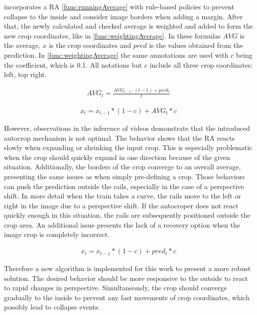 \cite{tepNet2024} incorporates a \ac{RA} \autoref{func:runningAverage} with rule-based policies to prevent collapse to the inside and consider image borders when adding a margin. After that, the newly calculated and checked average is weighted and added to form the new crop coordinates, like in \autoref{func:weightingAverage}. In these formulas $AVG$ is the average, $x$ is the crop coordinates and $pred$ is the values obtained from the prediction. In \autoref{func:weightingAverage} the same annotations are used with $c$ being the coefficient, which is 0.1. All notations but $c$ include all three crop coordinates: left, top right.

\begin{align}
    AVG_t = \frac{AVG_{t-1} \cdot (t-1) + pred_t}{t}
    \label{func:runningAverage}
\end{align}

\begin{align}
    x_{t} = x_{t-1} * (1 - c) + AVG_{t} * c
    \label{func:weightingAverage}
\end{align}

However, observations in the inference of videos demonstrate that the introduced autocrop mechanism is not optimal. The behavior shows that the \ac{RA} reacts slowly when expanding or shrinking the input crop. This is especially problematic when the crop should quickly expand in one direction because of the given situation. Additionally, the borders of the crop converge to an overall average, presenting the same issues as when simply pre-defining a crop. Those behaviors can push the prediction outside the rails, especially in the case of a perspective shift. In more detail when the train takes a curve, the rails move to the left or right in the image due to a perspective shift. If the autocroper does not react quickly enough in this situation, the rails are subsequently positioned outside the crop area. An additional issue presents the lack of a recovery option when the image crop is completely incorrect.

\begin{align}
    x_t =  x_{t-1} * (1 - c) + pred_t * c
    \label{func:EMA}
\end{align}

Therefore a new algorithm is implemented for this work to present a more robust solution.
The desired behavior should be more responsive to the outside to react to rapid changes in perspective.
Simultaneously, the crop should converge gradually to the inside to prevent any fast movements of crop coordinates, which possibly lead to collapse events.

